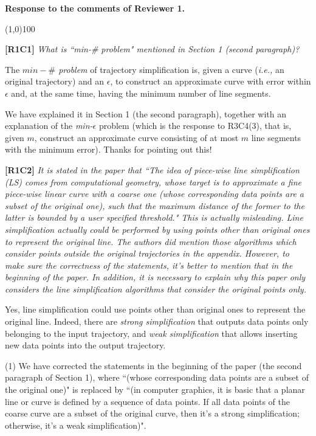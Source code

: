\documentclass{letter}
\newcommand{\ie}{\emph{i.e.,}\xspace}
\begin{document}
\textbf{Response to the comments of Reviewer 1.}

\line(1,0){100}


\textbf{[R1C1]} \emph{What is ``min-\# problem" mentioned in Section 1 (second paragraph)?}


The \emph{$min-\#$ problem} of trajectory simplification is, given a curve (\ie an original trajectory) and an $\epsilon$, to construct an approximate curve with error within $\epsilon$ and, at the same time, having the minimum number of line segments.

We have explained it in Section 1 (the second paragraph), together with an explanation of the \emph{min-$\epsilon$} problem (which is the response to R3C4(3), that is, given $m$, construct an approximate curve consisting of at most $m$ line segments with the minimum error).
Thanks for pointing out this!

\textbf{[R1C2]} \emph{It is stated in the paper that ``The idea of piece-wise line simplification (LS) comes from computational geometry, whose target is to approximate a fine piece-wise linear curve with a coarse one (whose corresponding data points are a subset of the original one), such that the maximum distance of the former to the latter is bounded by a user specified threshold." This is actually misleading. Line simplification actually could be performed by using points other than original ones to represent the original line. The authors did mention those algorithms which consider points outside the original trajectories in the appendix. However, to make sure the correctness of the statements, it's better to mention that in the beginning of the paper. In addition, it is necessary to explain why this paper only considers the line simplification algorithms that consider the original points only. }

Yes, line simplification could use points other than original ones to represent the original line. Indeed, there are \emph{strong simplification} that outputs data points only belonging to the input trajectory, and \emph{weak simplification} that allows inserting new data points into the output trajectory.

(1) We have corrected the statements in the beginning of the paper (the second paragraph of Section 1), where ``(whose corresponding data points are a subset of the original one)" is replaced by ``(in computer graphics, it is basic that a planar line or curve is defined by a sequence of data points. If all data points of the coarse curve are a subset of the original curve, then it's a strong simplification; otherwise, it's a weak simplification)".
\end{document}
